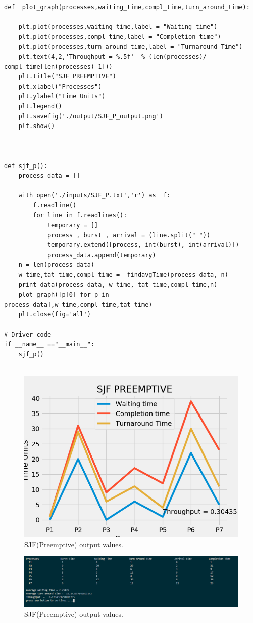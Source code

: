 \documentclass[11pt,a4paper]{report}
\begin{document}
\begin{lstlisting}[columns=fullflexible,caption=SJF (Preemptive) Source Code,breaklines=true,postbreak=\mbox{\textcolor{red}{$\hookrightarrow$}\space},]
def  plot_graph(processes,waiting_time,compl_time,turn_around_time):

	plt.plot(processes,waiting_time,label = "Waiting time")
	plt.plot(processes,compl_time,label = "Completion time")
	plt.plot(processes,turn_around_time,label = "Turnaround Time")
	plt.text(4,2,'Throughput = %.5f'  % (len(processes)/ compl_time[len(processes)-1]))
	plt.title("SJF PREEMPTIVE")
	plt.xlabel("Processes")
	plt.ylabel("Time Units")
	plt.legend()
	plt.savefig('./output/SJF_P_output.png')
	plt.show()



def sjf_p():
	process_data = []
	
	with open('./inputs/SJF_P.txt','r') as  f:
		f.readline()
		for line in f.readlines():
			temporary = []
			process , burst , arrival = (line.split(" "))
			temporary.extend([process, int(burst), int(arrival)])
			process_data.append(temporary)
	n = len(process_data)
	w_time,tat_time,compl_time =  findavgTime(process_data, n) 
	print_data(process_data, w_time, tat_time,compl_time,n)
	plot_graph([p[0] for p in process_data],w_time,compl_time,tat_time)
	plt.close(fig='all')

# Driver code  
if __name__ =="__main__": 
	sjf_p()


\end{lstlisting}
{\begin{figure}[H]
	\centering
	\includegraphics[scale=0.75]{./img/SJF_P_output.png}
	\caption{SJF(Preemptive) output values.}
\end{figure}}

{\begin{figure}[H]
	\centering
	\includegraphics[scale=0.5]{./img/sjf_p_out.PNG}
	\caption{SJF(Preemptive) output values.}
\end{figure}}
\end{document}
